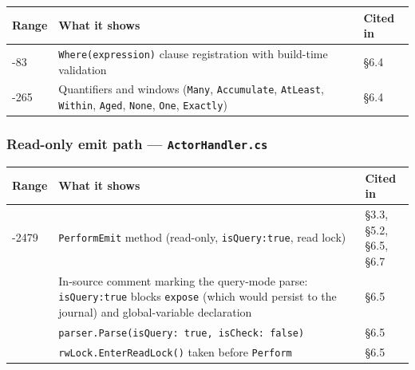 \documentclass[
]{article}
\newcounter{none} %
\let\origtexttt\texttt%
\renewcommand{\texttt}[1]{\origtexttt{\seqsplit{#1}}}%
\let\texttt\origtexttt%
\begin{document}
{\def\LTcaptype{none} %
\begin{longtable}[]{@{}
  >{\raggedright\arraybackslash}p{}
  >{\raggedright\arraybackslash}p{}
  >{\raggedright\arraybackslash}p{}@{}}
\toprule\noalign{}
\begin{minipage}[b]{\linewidth}\raggedright
Range
\end{minipage} & \begin{minipage}[b]{\linewidth}\raggedright
What it shows
\end{minipage} & \begin{minipage}[b]{\linewidth}\raggedright
Cited in
\end{minipage} \\
\midrule\noalign{}
\endhead
\bottomrule\noalign{}
\endlastfoot
71-83 & \texttt{Where(expression)} clause registration with build-time
validation & §6.4 \\
146-265 & Quantifiers and windows (\texttt{Many}, \texttt{Accumulate},
\texttt{AtLeast}, \texttt{Within}, \texttt{Aged}, \texttt{None},
\texttt{One}, \texttt{Exactly}) & §6.4 \\
\end{longtable}
}

\subsubsection{\texorpdfstring{Read-only emit path ---
\texttt{ActorHandler.cs}}{Read-only emit path --- ActorHandler.cs}}\label{read-only-emit-path-actorhandler.cs}

{\def\LTcaptype{none} %
\begin{longtable}[]{@{}
  >{\raggedright\arraybackslash}p{}
  >{\raggedright\arraybackslash}p{}
  >{\raggedright\arraybackslash}p{}@{}}
\toprule\noalign{}
\begin{minipage}[b]{\linewidth}\raggedright
Range
\end{minipage} & \begin{minipage}[b]{\linewidth}\raggedright
What it shows
\end{minipage} & \begin{minipage}[b]{\linewidth}\raggedright
Cited in
\end{minipage} \\
\midrule\noalign{}
\endhead
\bottomrule\noalign{}
\endlastfoot
2408-2479 & \texttt{PerformEmit} method (read-only,
\texttt{isQuery:true}, read lock) & §3.3, §5.2, §6.5, §6.7 \\
2405 & In-source comment marking the query-mode parse:
\texttt{isQuery:true} blocks \texttt{expose} (which would persist to the
journal) and global-variable declaration & §6.5 \\
2423 & \texttt{parser.Parse(isQuery:\ true,\ isCheck:\ false)} & §6.5 \\
2464 & \texttt{rwLock.EnterReadLock()} taken before \texttt{Perform} &
§6.5 \\
\end{longtable}
}
\end{document}
